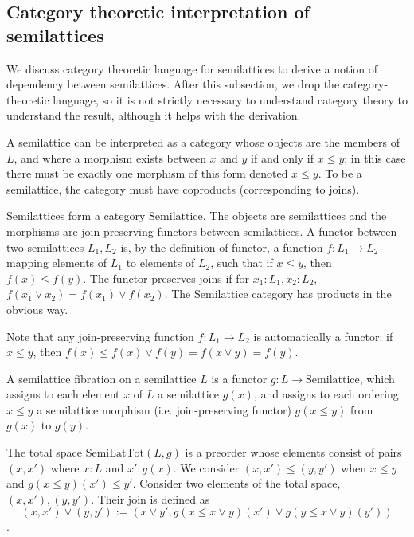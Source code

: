 \documentclass{article}
\begin{document}
    \subsection{Category theoretic interpretation of semilattices}

      We discuss category theoretic language for semilattices to derive a notion of dependency between semilattices. After this subsection, we drop the category-theoretic language, so it is not strictly necessary to understand category theory to understand the result, although it helps with the derivation.

      A semilattice can be interpreted as a category whose objects are the members of $L$, and where a morphism exists between $x$ and $y$ if and only if $x \leq y$; in this case there must be exactly one morphism of this form denoted $x \leq y$. To be a semilattice, the category must have coproducts (corresponding to joins).

      Semilattices form a category $\mathrm{Semilattice}$.  The objects are semilattices and the morphisms are join-preserving functors between semilattices. A functor between two semilattices $L_1, L_2$ is, by the definition of functor, a function $f: L_1 \rightarrow L_2$ mapping elements of $L_1$ to elements of $L_2$, such that if $x \leq y$, then $f(x) \leq f(y)$. The functor preserves joins if for $x_1 : L_1, x_2 : L_2$, $f(x_1 \vee x_2) = f(x_1) \vee f(x_2)$. The $\mathrm{Semilattice}$ category has products in the obvious way.

      Note that any join-preserving function $f : L_1 \rightarrow L_2$ is automatically a functor: if $x \leq y$, then $f(x) \leq f(x) \vee f(y) = f(x \vee y) = f(y)$. 

      A semilattice fibration on a semilattice $L$ is a functor $g : L \rightarrow \mathrm{Semilattice}$, which assigns to each element $x$ of $L$ a semilattice $g(x)$, and assigns to each ordering $x \leq y$ a semilattice morphism (i.e. join-preserving functor) $g(x \leq y)$ from $g(x)$ to $g(y)$.

      The total space $\mathrm{SemiLatTot}(L, g)$ is a preorder whose elements consist of pairs $(x, x')$ where $x : L$ and $x' : g(x)$. We consider $(x, x') \leq (y, y')$ when $x \leq y$ and $g(x \leq y)(x') \leq y'$. Consider two elements of the total space, $(x, x'), (y, y')$. Their join is defined as $$(x, x') \vee (y, y') := (x \vee y', g(x \leq x \vee y)(x') \vee g(y \leq x \vee y)(y'))$$. 
\end{document}
